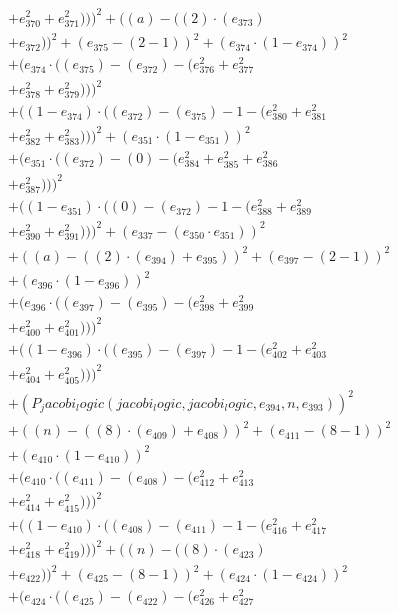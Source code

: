 \documentclass[10pt, a4paper]{article}
\begin{document}
\begin{align*}
& + e_{370}^{2} + e_{371}^{2})))^{2} + ((a) - ((2)  \cdot  (e_{373}) \\
& + e_{372}))^{2} + (e_{375} - (2 - 1))^{2} + (e_{374}  \cdot  (1 - e_{374}))^{2} \\
& + (e_{374}  \cdot  ((e_{375}) - (e_{372}) - (e_{376}^{2} + e_{377}^{2} \\
& + e_{378}^{2} + e_{379}^{2})))^{2} \\
& + ((1 - e_{374})  \cdot  ((e_{372}) - (e_{375}) - 1 - (e_{380}^{2} + e_{381}^{2} \\
& + e_{382}^{2} + e_{383}^{2})))^{2} + (e_{351}  \cdot  (1 - e_{351}))^{2} \\
& + (e_{351}  \cdot  ((e_{372}) - (0) - (e_{384}^{2} + e_{385}^{2} + e_{386}^{2} \\
& + e_{387}^{2})))^{2} \\
& + ((1 - e_{351})  \cdot  ((0) - (e_{372}) - 1 - (e_{388}^{2} + e_{389}^{2} \\
& + e_{390}^{2} + e_{391}^{2})))^{2} + (e_{337} - (e_{350}  \cdot  e_{351}))^{2} \\
& + ((a) - ((2)  \cdot  (e_{394}) + e_{395}))^{2} + (e_{397} - (2 - 1))^{2} \\
& + (e_{396}  \cdot  (1 - e_{396}))^{2} \\
& + (e_{396}  \cdot  ((e_{397}) - (e_{395}) - (e_{398}^{2} + e_{399}^{2} \\
& + e_{400}^{2} + e_{401}^{2})))^{2} \\
& + ((1 - e_{396})  \cdot  ((e_{395}) - (e_{397}) - 1 - (e_{402}^{2} + e_{403}^{2} \\
& + e_{404}^{2} + e_{405}^{2})))^{2} \\
& + (P_jacobi_logic(jacobi_logic, jacobi_logic, e_{394}, n, e_{393}))^{2} \\
& + ((n) - ((8)  \cdot  (e_{409}) + e_{408}))^{2} + (e_{411} - (8 - 1))^{2} \\
& + (e_{410}  \cdot  (1 - e_{410}))^{2} \\
& + (e_{410}  \cdot  ((e_{411}) - (e_{408}) - (e_{412}^{2} + e_{413}^{2} \\
& + e_{414}^{2} + e_{415}^{2})))^{2} \\
& + ((1 - e_{410})  \cdot  ((e_{408}) - (e_{411}) - 1 - (e_{416}^{2} + e_{417}^{2} \\
& + e_{418}^{2} + e_{419}^{2})))^{2} + ((n) - ((8)  \cdot  (e_{423}) \\
& + e_{422}))^{2} + (e_{425} - (8 - 1))^{2} + (e_{424}  \cdot  (1 - e_{424}))^{2} \\
& + (e_{424}  \cdot  ((e_{425}) - (e_{422}) - (e_{426}^{2} + e_{427}^{2} \\

\end{align*}
\end{document}
